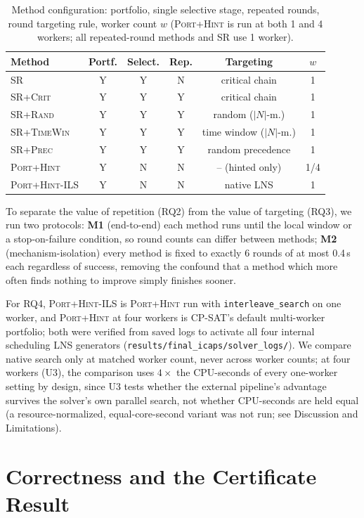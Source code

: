 \documentclass[letterpaper]{article} %
\newcommand{\base}{\textsc{SR}}
\newcommand{\crit}{\textsc{SR+Crit}}
\newcommand{\rnd}{\textsc{SR+Rand}}
\newcommand{\tw}{\textsc{SR+TimeWin}}
\newcommand{\precn}{\textsc{SR+Prec}}
\newcommand{\ph}{\textsc{Port+Hint}}
\newcommand{\native}{\textsc{Port+Hint-ILS}}
\begin{document}
\begin{table}[t]
\centering\footnotesize
\setlength{\tabcolsep}{2.3pt}
\begin{tabular}{lccccc}
\toprule
Method & Portf. & Select. & Rep. & Targeting & $w$ \\
\midrule
\base{} & Y & Y & N & critical chain & 1 \\
\crit{} & Y & Y & Y & critical chain & 1 \\
\rnd{} & Y & Y & Y & random ($|N|$-m.) & 1 \\
\tw{} & Y & Y & Y & time window ($|N|$-m.) & 1 \\
\precn{} & Y & Y & Y & random precedence & 1 \\
\ph{} & Y & N & N & -- (hinted only) & 1/4 \\
\native{} & Y & N & N & native LNS & 1 \\
\bottomrule
\end{tabular}
\caption{Method configuration: portfolio, single selective stage, repeated rounds, round targeting rule, worker count $w$ (\ph{} is run at both 1 and 4 workers; all repeated-round methods and \base{} use 1 worker).}
\label{tab:methods}
\end{table}

To separate the value of repetition (RQ2) from the value of targeting (RQ3), we run two protocols: \textbf{M1} (end-to-end) each method runs until the local window or a stop-on-failure condition, so round counts can differ between methods; \textbf{M2} (mechanism-isolation) every method is fixed to exactly 6 rounds of at most 0.4\,s each regardless of success, removing the confound that a method which more often finds nothing to improve simply finishes sooner.

For RQ4, \native{} is \ph{} run with \texttt{interleave\_search} on one worker, and \ph{} at four workers is CP-SAT's default multi-worker portfolio; both were verified from saved logs to activate all four internal scheduling LNS generators (\texttt{re\-sults/\-fi\-nal\_i\-caps/\-sol\-ver\_logs/}). We compare native search only at matched worker count, never across worker counts; at four workers (U3), the comparison uses $4\times$ the CPU-seconds of every one-worker setting by design, since U3 tests whether the external pipeline's advantage survives the solver's own parallel search, not whether CPU-seconds are held equal (a resource-normalized, equal-core-second variant was not run; see Discussion and Limitations).

\section{Correctness and the Certificate Result}
\label{sec:certificate}
\end{document}
